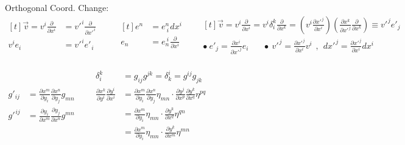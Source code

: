\documentclass[12pt]{article}
\newcommand{\hs}{\hspace{1pt}} %
\newcommand{\hsvec}[1]{\vec{\hs #1}} %
\begin{document}
%
%
%
\newpage
Orthogonal Coord. Change:\\[5pt]
\(
	\begin{aligned}[t]
		\hsvec{v} = v^i \frac{\partial}{\partial x^i} & = v'^{\hs i} \frac{\partial}{\partial x'^{\hs i}} \\[5pt]
		v^i e_i & = v'^{\hs i} e'_{\hs i} \\
	\end{aligned}
	\hspace{25pt}
	\begin{aligned}[t]
		e^n & = e^n_{\ i} \hs dx^i\\
		e_n & = e_n^{\ i} \hs \tfrac{\partial}{\partial x^i}\\
	\end{aligned}
	\hspace{20pt}
	\begin{gathered}[t]
		\hsvec{v} = v^i \frac{\partial}{\partial x^i}
			= v^i \delta_i^{k}\frac{\partial}{\partial x^k}
			= \left(v^i \frac{\partial x'^{\hs j}}{\partial x^i}\right) 
			\left(\frac{\partial x^k}{\partial x'^{\hs j}} \frac{\partial}{\partial x^k}\right)
			\equiv v'^{\hs j} e'_j
			\\
		\bullet\ e'_j = \frac{\partial x^i}{\partial x'^{\hs j}} e_i
			\hspace{20pt} \bullet\ v'^{\hs j} = \frac{\partial x'^{\hs j}}{\partial x^i} v^i
			\hspace{5pt} , \hspace{5pt} dx'^{\hs j} = \frac{\partial x'^{\hs j}}{\partial x^i} dx^i
			\\
	\end{gathered}
\)


\vspace{15pt}
\(
	\begin{aligned}
		g'_{ij} & = \frac{\partial x^m}{\partial y_i} \frac{\partial x^n}{\partial y_j} g_{mn}\\
		g'^{\hs ij} & = \frac{\partial y_i}{\partial x^m} \frac{\partial y_j}{\partial x^n} g^{mn}
	\end{aligned}
	\hspace{20pt}
	\begin{aligned}
		\delta_i^k & = g_{ij} g^{jk} =  \delta^i_k = g^{ij} g_{jk} \\[5pt]
		\tfrac{\partial x^k}{\partial y^i} \tfrac{\partial y^i}{\partial x^i} & 
			= \tfrac{\partial x^m}{\partial y_i} \tfrac{\partial x^n}{\partial y_j} \eta_{mn}
			\cdot \tfrac{\partial y^j}{\partial x^p} \tfrac{\partial y^k}{\partial x^q} \eta^{pq}
			\\
		& = \tfrac{\partial x^m}{\partial y_i} \eta_{mn}
			\cdot \tfrac{\partial y^k}{\partial x^q} \eta^{qn}
			\\
		& = \tfrac{\partial x^m}{\partial y_i} \eta_{mn}
			\cdot \tfrac{\partial y^k}{\partial x^m} \eta^{mn}
	\end{aligned}
\)
\end{document}
